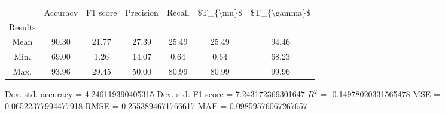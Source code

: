 \begin{tabular}{|c|c|c|c|c|c|c|}
\toprule
{} &  Accuracy &  F1 score &  Precision &  Recall &  \$T\_\{\textbackslash mu\}\$ &  \$T\_\{\textbackslash gamma\}\$ \\
Results &           &           &            &         &            &               \\
\hline
Mean    &     90.30 &     21.77 &      27.39 &   25.49 &      25.49 &         94.46 \\
Min.    &     69.00 &      1.26 &      14.07 &    0.64 &       0.64 &         68.23 \\
Max.    &     93.96 &     29.45 &      50.00 &   80.99 &      80.99 &         99.96 \\
\bottomrule
\end{tabular}

 Dev. std. accuracy = 4.246119390405315
 Dev. std. F1-score = 7.243172369301647
 $R^2$ = -0.14978020331565478
 MSE = 0.06522377994477918
 RMSE = 0.2553894671766617
 MAE = 0.09859576067267657